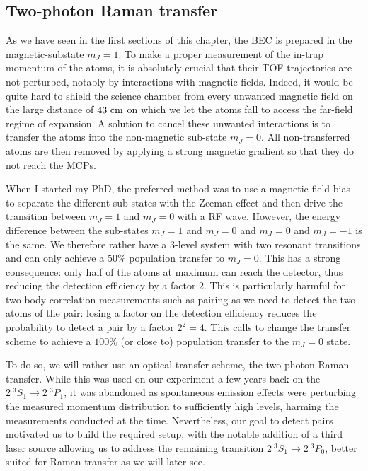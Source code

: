 \subsection{Two-photon Raman transfer}

\label{sec:raman}

As we have seen in the first sections of this chapter, the BEC is prepared in the magnetic-substate $m_J=1$. To make a proper measurement of the in-trap momentum of the atoms, it is absolutely crucial that their TOF trajectories are not perturbed, notably by interactions with magnetic fields. Indeed, it would be quite hard to shield the science chamber from every unwanted magnetic field on the large distance of $43 \ \rm{cm}$ on which we let the atoms fall to access the far-field regime of expansion. A solution to cancel these unwanted interactions is to transfer the atoms into the non-magnetic sub-state $m_J=0$. All non-transferred atoms are then removed by applying a strong magnetic gradient so that they do not reach the MCPs.

When I started my PhD, the preferred method was to use a magnetic field bias to separate the different sub-states with the Zeeman effect and then drive the transition between $m_J=1$ and $m_J=0$ with a RF wave. However, the energy difference between the sub-states $m_J=1$ and $m_J=0$ and $m_J=0$ and $m_J=-1$ is the same. We therefore rather have a 3-level system with two resonant transitions and can only achieve a $50\%$ population transfer to $m_J=0$. This has a strong consequence: only half of the atoms at maximum can reach the detector, thus reducing the detection efficiency by a factor 2. This is particularly harmful for two-body correlation measurements such as \kmk pairing as we need to detect the two atoms of the pair: losing a factor on the detection efficiency reduces the probability to detect a \kmk pair by a factor $2^2=4$. This calls to change the transfer scheme to achieve a $100\%$ (or close to) population transfer to the $m_J=0$ state.

To do so, we will rather use an optical transfer scheme, the two-photon Raman transfer. While this was used on our experiment a few years back on the $2 \ ^3 S_1 \rightarrow 2 \ ^3 P_1$, it was abandoned as spontaneous emission effects were perturbing the measured momentum distribution to sufficiently high levels, harming the measurements conducted at the time. Nevertheless, our goal to detect \kmk pairs motivated us to build the required setup, with the notable addition of a third laser source allowing us to address the remaining transition $2 \ ^3 S_1 \rightarrow 2 \ ^3 P_0$, better suited for Raman transfer as we will later see.


